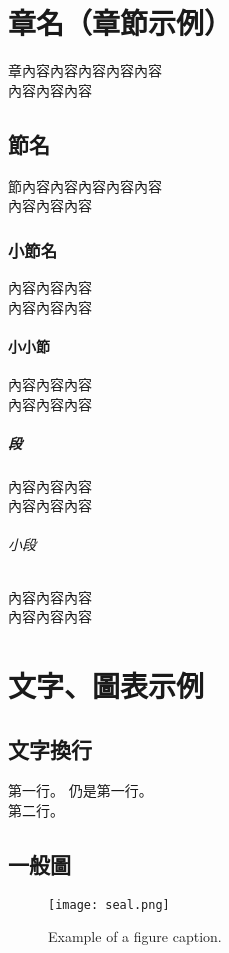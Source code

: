 
\chapter{章名（章節示例）}
章內容內容內容內容內容 \\
內容內容內容

\section{節名}
節內容內容內容內容內容 \\
內容內容內容

\subsection{小節名}
內容內容內容 \\
內容內容內容

\subsubsection{小小節}
內容內容內容 \\
內容內容內容

\paragraph{段}
內容內容內容 \\
內容內容內容

\subparagraph{小段}
內容內容內容 \\
內容內容內容


\chapter{文字、圖表示例}
\section{文字換行}
第一行。
仍是第一行。 \\
第二行。

\section{一般圖}
\begin{figure}[htbp]
    \centerline{\texttt{[image: seal.png]}}
    \caption{Example of a figure caption.}
    \label{fig}
\end{figure}


